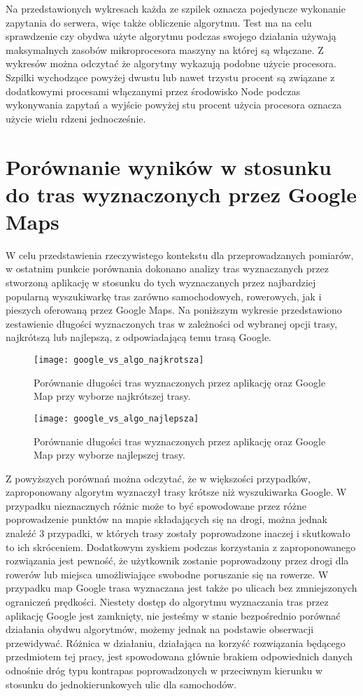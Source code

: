 Na przedstawionych wykresach każda ze szpilek oznacza pojedyncze wykonanie zapytania do serwera, więc także obliczenie algorytmu. Test ma na celu sprawdzenie czy obydwa użyte algorytmu podczas swojego działania używają maksymalnych zasobów mikroprocesora maszyny na której są włączane. Z wykresów można odczytać że algorytmy wykazują podobne użycie procesora. Szpilki wychodzące powyżej dwustu lub nawet trzystu procent są związane z dodatkowymi procesami włączanymi przez środowisko Node podczas wykonywania zapytań a wyjście powyżej stu procent użycia procesora oznacza użycie wielu rdzeni jednocześnie.

\section{Porównanie wyników w stosunku do tras wyznaczonych przez Google Maps}

W celu przedstawienia rzeczywistego kontekstu dla przeprowadzanych pomiarów, w ostatnim punkcie porównania dokonano analizy tras wyznaczanych przez stworzoną aplikację w stosunku do tych wyznaczanych przez najbardziej popularną wyszukiwarkę tras zarówno samochodowych, rowerowych, jak i pieszych oferowaną przez Google Maps. Na poniższym wykresie przedstawiono zestawienie długości wyznaczonych tras w zależności od wybranej opcji trasy, najkrótszą lub najlepszą, z odpowiadającą temu trasą Google.

\begin{figure}[H]
\centering
\texttt{[image: google\_vs\_algo\_najkrotsza]}
\caption{Porównanie długości tras wyznaczonych przez aplikację oraz Google Map przy wyborze najkrótszej trasy.}
\end{figure}

\begin{figure}[H]
\centering
\texttt{[image: google\_vs\_algo\_najlepsza]}
\caption{Porównanie długości tras wyznaczonych przez aplikację oraz Google Map przy wyborze najlepszej trasy.}
\end{figure}

Z powyższych porównań można odczytać, że w większości przypadków, zaproponowany algorytm wyznaczył trasy krótsze niż wyszukiwarka Google. W przypadku nieznacznych różnic może to być spowodowane przez różne poprowadzenie punktów na mapie składających się na drogi, można jednak znaleźć 3 przypadki, w których trasy zostały poprowadzone inaczej i skutkowało to ich skróceniem. Dodatkowym zyskiem podczas korzystania z zaproponowanego rozwiązania jest pewność, że użytkownik zostanie poprowadzony przez drogi dla rowerów lub miejsca umożliwiające swobodne poruszanie się na rowerze. W przypadku map Google trasa wyznaczana jest także po ulicach bez zmniejszonych ograniczeń prędkości. Niestety dostęp do algorytmu wyznaczania tras przez aplikację Google jest zamknięty, nie jesteśmy w stanie bezpośrednio porównać działania obydwu algorytmów, możemy jednak na podstawie obserwacji przewidywać. Różnica w działaniu, działająca na korzyść  rozwiązania będącego przedmiotem tej pracy, jest spowodowana głównie brakiem odpowiednich danych odnośnie dróg typu kontrapas poprowadzonych w przeciwnym kierunku w stosunku do jednokierunkowych ulic dla samochodów.